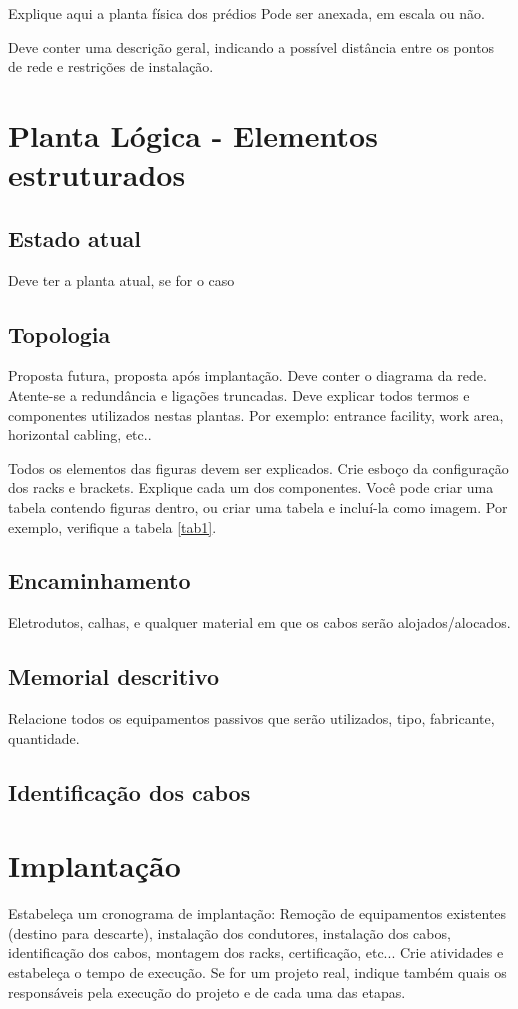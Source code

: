 \documentclass[	DIV=calc,%
							paper=a4,%
							fontsize=12pt,%
							onecolumn]{scrartcl}	 					%
\begin{document}
Explique aqui a planta física dos prédios
Pode ser anexada, em escala ou não.

Deve conter uma descrição geral, indicando a possível distância entre os pontos de rede e restrições de instalação.

\section{Planta Lógica - Elementos estruturados}

\subsection{Estado atual}
Deve ter a planta atual, se for o caso

\subsection{Topologia}
Proposta futura, proposta após implantação.
Deve conter o diagrama da rede. Atente-se a redundância  e ligações truncadas.
Deve explicar todos termos e componentes utilizados nestas plantas. Por exemplo: entrance facility, work area, horizontal cabling, etc..

Todos os elementos das figuras devem ser explicados. 
Crie esboço da configuração dos racks e brackets. Explique cada um dos componentes. Você pode criar uma tabela contendo figuras dentro, ou criar uma tabela e incluí-la como imagem. Por exemplo, verifique a tabela \ref{tab1}.



\subsection{Encaminhamento}
Eletrodutos, calhas, e qualquer material em que os cabos serão alojados/alocados.

\subsection{Memorial descritivo}

Relacione todos os equipamentos passivos que serão utilizados, tipo, fabricante, quantidade.

\subsection{Identificação dos cabos}

\section{Implantação}
Estabeleça um cronograma de implantação:
Remoção de equipamentos existentes (destino para descarte), instalação dos condutores, instalação dos cabos, 
identificação dos cabos, montagem dos racks, certificação, etc... Crie atividades e estabeleça o tempo de execução. Se for um projeto real, indique também quais os responsáveis pela execução do projeto e de cada uma das etapas.
\end{document}
